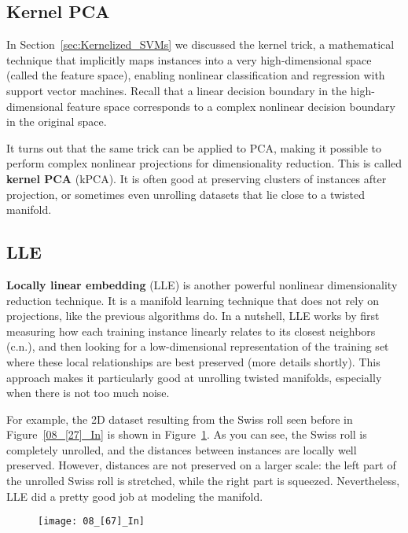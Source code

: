 \subsection{Kernel PCA}
In Section~\ref{sec:Kernelized_SVMs} we discussed the kernel trick, a mathematical technique that implicitly maps instances into a very high-dimensional space (called the feature space), enabling nonlinear classification and regression with support vector machines. Recall that a linear decision boundary in the high-dimensional feature space corresponds to a complex nonlinear decision boundary in the original space.

It turns out that the same trick can be applied to PCA, making it possible to perform complex nonlinear projections for dimensionality reduction. This is called \textbf{kernel PCA} (kPCA). It is often good at preserving clusters of instances after projection, or sometimes even unrolling datasets that lie close to a twisted manifold.
\subsection{LLE}
\textbf{Locally linear embedding} (LLE) is another powerful nonlinear dimensionality reduction technique. It is a manifold learning technique that does not rely on projections, like the previous algorithms do. In a nutshell, LLE works by first measuring how each training instance linearly relates to its closest neighbors (c.n.), and then looking for a low-dimensional representation of the training set where these local relationships are best preserved (more details shortly). This approach makes it particularly good at unrolling twisted manifolds, especially when there is not too much noise.

For example, the 2D dataset resulting from the Swiss roll seen before in Figure~\ref{08_[27]_In} is shown in Figure~\ref{08_[67]_In}. As you can see, the Swiss roll is completely unrolled, and the distances between instances are locally well preserved. However, distances are not preserved on a larger scale: the left part of the unrolled Swiss roll is stretched, while the right part is squeezed. Nevertheless, LLE did a pretty good job at modeling the manifold.
\begin{figure}[h!t]
\centering
\texttt{[image: 08\_[67]\_In]}
\caption{}\label{08_[67]_In}
\end{figure}

